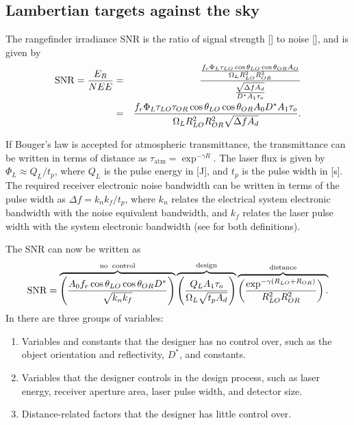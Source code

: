 
\subsection{Lambertian targets against the sky}

\noindent
The rangefinder irradiance SNR is the ratio of signal strength
[] to noise [], and is given by
\begin{eqnarray}
\operatorname{SNR} = \frac{E_R}{NEE}&=&\frac{
\frac{
f_r  \Phi_L \tau_{LO} \cos\theta_{LO} \cos\theta_{OR} A_O
}{
 \Omega_L R^2_{LO}R^2_{OR} }
}{\frac{\sqrt{\Delta f A_d}}{D^\ast A_1 \tau_o}}\\
&=&\frac{f_r \Phi_L
\tau_{LO}\tau_{OR} \cos\theta_{LO} \cos\theta_{OR}A_0D^\ast A_1 \tau_o}
{\Omega_L R^2_{LO}R^2_{OR}
\sqrt{\Delta f A_d}}.
\end{eqnarray}

If Bouger's law is accepted for atmospheric transmittance, the transmittance can be written in terms of distance as $\tau_\textrm{atm}=\exp^{-\gamma R}$. The laser flux is given by $\Phi_L\approx Q_L/t_p$, where $Q_L$ is the pulse
energy in [J], and $t_p$ is the pulse width in [s]. The required receiver
electronic noise bandwidth can be written in terms of the pulse width as
$\Delta f=k_nk_f/t_p$, where 
$k_n$ relates the electrical system electronic bandwidth with the noise equivalent bandwidth, and 
$k_f$ relates the laser pulse width with the system electronic bandwidth (see \cite{Willers2013} for both definitions).

The SNR can now be written as
\begin{equation}
\operatorname{SNR} = 
\overbrace{
\left(\frac{A_0f_r  \cos\theta_{LO} \cos\theta_{OR} D^\ast }{\sqrt{k_nk_f}}\right)
}^{\rm no\;\;control}
\overbrace{
\left(\frac{Q_L A_1 \tau_o }{\Omega_L\sqrt{t_p A_d}}\right)
}^{\rm design}
\overbrace{
\left(\frac{\exp^{-\gamma (R_{LO}+R_{OR})} }{R^2_{LO}R^2_{OR}}\right).\\
}^{\rm distance}
\label{lrfd2}
\end{equation}
In  there are three groups of variables:

\begin{enumerate}[1.]

\item 
Variables and constants that the designer has no control over, such as the object orientation and reflectivity, $D^\ast$, and constants.

\item 
Variables that the designer controls in the design process, such as laser energy, receiver aperture area, laser pulse width, and detector size.

\item 
Distance-related factors that the designer has little control over.

\end{enumerate}

